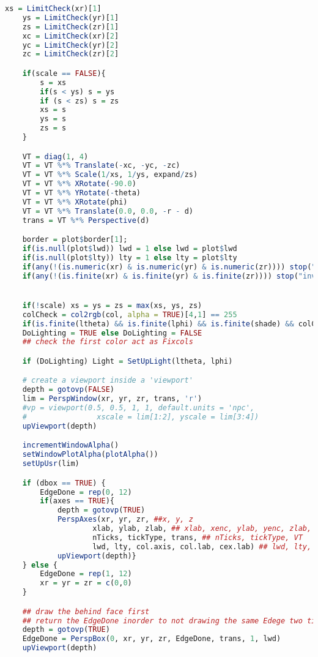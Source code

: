 \begin{lstlisting}[language = R]
    xs = LimitCheck(xr)[1]
    ys = LimitCheck(yr)[1]
    zs = LimitCheck(zr)[1]
    xc = LimitCheck(xr)[2]
    yc = LimitCheck(yr)[2]
    zc = LimitCheck(zr)[2]

    if(scale == FALSE){
        s = xs
        if(s < ys) s = ys
        if (s < zs) s = zs
        xs = s
        ys = s
        zs = s
    }

    VT = diag(1, 4)
    VT = VT %*% Translate(-xc, -yc, -zc)
    VT = VT %*% Scale(1/xs, 1/ys, expand/zs)
    VT = VT %*% XRotate(-90.0)
    VT = VT %*% YRotate(-theta)
    VT = VT %*% XRotate(phi)
    VT = VT %*% Translate(0.0, 0.0, -r - d)
    trans = VT %*% Perspective(d)

    border = plot$border[1];
    if(is.null(plot$lwd)) lwd = 1 else lwd = plot$lwd
    if(is.null(plot$lty)) lty = 1 else lty = plot$lty
    if(any(!(is.numeric(xr) & is.numeric(yr) & is.numeric(zr)))) stop("invalid limits")
    if(any(!(is.finite(xr) & is.finite(yr) & is.finite(zr)))) stop("invalid limits")


    if(!scale) xs = ys = zs = max(xs, ys, zs)
    colCheck = col2rgb(col, alpha = TRUE)[4,1] == 255
    if(is.finite(ltheta) && is.finite(lphi) && is.finite(shade) && colCheck)
    DoLighting = TRUE else DoLighting = FALSE
    ## check the first color act as Fixcols

    if (DoLighting) Light = SetUpLight(ltheta, lphi)

    # create a viewport inside a 'viewport'
    depth = gotovp(FALSE)
    lim = PerspWindow(xr, yr, zr, trans, 'r')
    #vp = viewport(0.5, 0.5, 1, 1, default.units = 'npc',
    #                xscale = lim[1:2], yscale = lim[3:4])
    upViewport(depth)

    incrementWindowAlpha()
    setWindowPlotAlpha(plotAlpha())
    setUpUsr(lim)

    if (dbox == TRUE) {
        EdgeDone = rep(0, 12)
        if(axes == TRUE){
            depth = gotovp(TRUE)
            PerspAxes(xr, yr, zr, ##x, y, z
                    xlab, ylab, zlab, ## xlab, xenc, ylab, yenc, zlab, zenc
                    nTicks, tickType, trans, ## nTicks, tickType, VT
                    lwd, lty, col.axis, col.lab, cex.lab) ## lwd, lty, col.axis, col.lab, cex.lab
            upViewport(depth)}
    } else {
        EdgeDone = rep(1, 12)
        xr = yr = zr = c(0,0)
    }

    ## draw the behind face first
    ## return the EdgeDone inorder to not drawing the same Edege two times.
    depth = gotovp(TRUE)
    EdgeDone = PerspBox(0, xr, yr, zr, EdgeDone, trans, 1, lwd)
    upViewport(depth)


\end{lstlisting}
